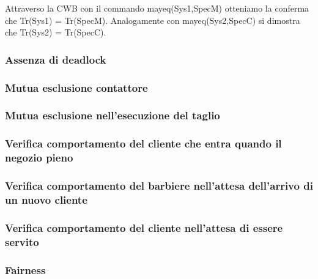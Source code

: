 Attraverso la CWB con il commando mayeq(Sys1,SpecM) otteniamo la conferma che Tr(Sys1) = Tr(SpecM). Analogamente con mayeq(Sys2,SpecC) si dimostra che Tr(Sys2) = Tr(SpecC).





\subsubsection{Assenza di deadlock}

\subsubsection{Mutua esclusione contattore}

\subsubsection{Mutua esclusione nell'esecuzione del taglio}

\subsubsection{Verifica comportamento del cliente che entra quando il negozio pieno}

\subsubsection{Verifica comportamento del barbiere nell'attesa dell'arrivo di un nuovo cliente }

\subsubsection{Verifica comportamento del cliente nell'attesa di essere servito }

\subsubsection{Fairness}



